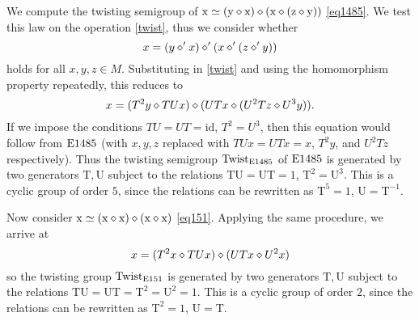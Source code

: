 \begin{example}  We compute the twisting semigroup of $\mathrm{x} \simeq (\mathrm{y} \diamond \mathrm{x}) \diamond (\mathrm{x} \diamond (\mathrm{z} \diamond \mathrm{y}))$ \eqref{eq1485}.  We test this law on the operation \eqref{twist}, thus we consider whether
$$x = (y \diamond' x) \diamond' (x \diamond' (z \diamond' y))$$
holds for all $x,y,z \in M$.  Substituting in \eqref{twist} and using the homomorphism property repeatedly, this reduces to
$$x = (T^2y \diamond TUx) \diamond (UTx \diamond (U^2T z \diamond U^3y)).$$
If we impose the conditions $TU=UT=\mathrm{id}$, $T^2 = U^3$, then this equation would follow from $\mathrm{E}1485$ (with $x,y,z$ replaced with $TUx=UTx=x$, $T^2 y$, and $U^2 Tz$ respectively).  Thus the twisting semigroup $\operatorname{Twist}_{\mathrm{E}1485}$ of $\mathrm{E}1485$ is generated by two generators $\mathrm{T}, \mathrm{U}$ subject to the relations $\mathrm{T} \mathrm{U}=\mathrm{U} \mathrm{T} = 1$, $\mathrm{T}^2 = \mathrm{U}^3$.  This is a cyclic group of order $5$, since the relations can be rewritten as $\mathrm{T}^5 = 1$, $\mathrm{U} = \mathrm{T}^{-1}$.

Now consider $\mathrm{x} \simeq (\mathrm{x} \diamond \mathrm{x}) \diamond (\mathrm{x} \diamond \mathrm{x})$ \eqref{eq151}.  Applying the same procedure, we arrive at
$$x = (T^2 x \diamond TUx) \diamond (UT x \diamond U^2 x)$$
so the twisting group $\operatorname{Twist}_{\mathrm{E}151}$ is generated by two generators $\mathrm{T}, \mathrm{U}$ subject to the relations $\mathrm{T} \mathrm{U}=\mathrm{U} \mathrm{T} = \mathrm{T}^2 = \mathrm{U}^2 = 1$.  This is a cyclic group of order $2$, since the relations can be rewritten as $\mathrm{T}^2 = 1$, $\mathrm{U} = \mathrm{T}$.
\end{example}

